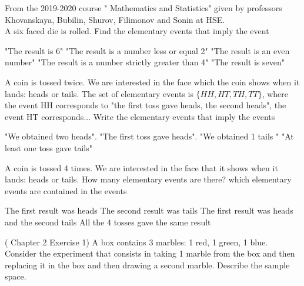 \begin{ExerciseList}
	\Exercise
       From the 2019-2020 course " Mathematics and Statistics" given by  professors 
       Khovanskaya, Bubilin, Shurov, Filimonov and Sonin at HSE.\\ 
       A six faced die is rolled. Find the elementary events that imply the event
    
      \Question "The result is 6"
      \Question "The result is a number less or equal 2"
      \Question "The result is an even number"
      \Question "The result is a number strictly greater than 4"
      \Question "The result is seven"  
    
%	
%
	\Exercise  A coin is tossed twice. We are interested in the face which the coin shows when it lands: heads or tails. The set of elementary events is $\{ HH, HT,TH,TT\}$, where the event HH corresponds to "the first toss gave heads, the second heads", the event HT corresponds... Write the elementary events that imply the events
   
         \Question "We obtained two heads".
         \Question "The first toss gave heads".
         \Question "We obtained 1 tails "
         \Question "At least one toss gave tails"
        
%
	
    \Exercise A coin is tossed 4 times. We are interested in the face that it shows when it lands: heads or tails. How many elementary events are there? which elementary events are contained in the events 
    
    
      \Question The first result was heads
      \Question The second result was tails
      \Question The first result was heads and the second tails 
      \Question All the 4 tosses gave the same result
    
%
%
	\Exercise (\cite{Ross} Chapter 2 Exercise 1)
	\label{exercise:marbles}
  A box contains 3 marbles: 1 red, 1 green, 1 blue. Consider the experiment that consists in taking 1 marble from the box and then replacing it in the box and then drawing a second marble. Describe the sample space.\\
 	

\end{ExerciseList}
